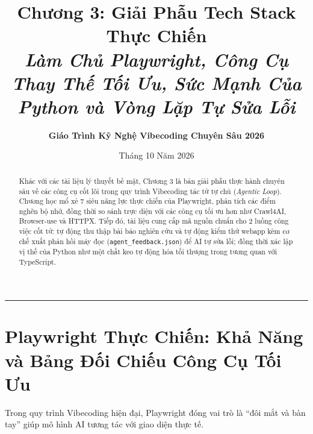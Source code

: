 \documentclass[a4paper,11pt]{article}
\title{\textbf{Chương 3: Giải Phẫu Tech Stack Thực Chiến}\\[0.3em]
\large\textit{Làm Chủ Playwright, Công Cụ Thay Thế Tối Ưu, Sức Mạnh Của Python và Vòng Lặp Tự Sửa Lỗi}}
\author{\textbf{Giáo Trình Kỹ Nghệ Vibecoding Chuyên Sâu 2026}}
\date{Tháng 10 Năm 2026}
\begin{document}
\maketitle

\begin{abstract}
Khác với các tài liệu lý thuyết bề mặt, Chương 3 là bản giải phẫu thực hành chuyên sâu về các công cụ cốt lõi trong quy trình Vibecoding tác tử tự chủ (\textit{Agentic Loop}). Chương học mổ xẻ 7 siêu năng lực thực chiến của Playwright, phân tích các điểm nghẽn bộ nhớ, đồng thời so sánh trực diện với các công cụ tối ưu hơn như Crawl4AI, Browser-use và HTTPX. Tiếp đó, tài liệu cung cấp mã nguồn chuẩn cho 2 luồng công việc cốt tử: tự động thu thập bài báo nghiên cứu và tự động kiểm thử webapp kèm cơ chế xuất phản hồi máy đọc (\texttt{agent\_feedback.json}) để AI tự sửa lỗi; đồng thời xác lập vị thế của Python như một chất keo tự động hóa tối thượng trong tương quan với TypeScript.
\end{abstract}

\vspace{1em}
\rule{\textwidth}{0.4pt}

\section{Playwright Thực Chiến: Khả Năng và Bảng Đối Chiếu Công Cụ Tối Ưu}

Trong quy trình Vibecoding hiện đại, Playwright đóng vai trò là ``đôi mắt và bàn tay'' giúp mô hình AI tương tác với giao diện thực tế.
\end{document}
